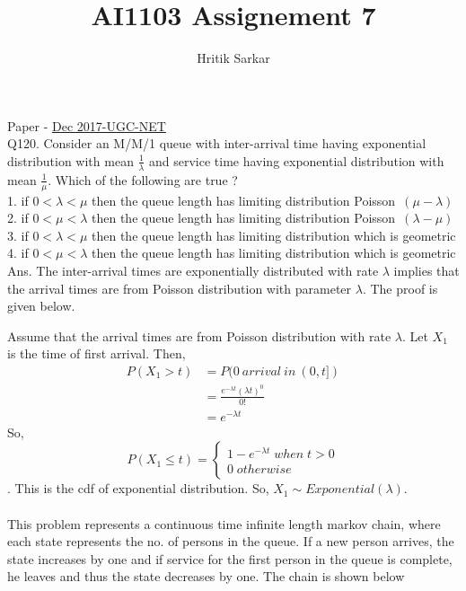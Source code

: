 \documentclass{article}
\title{AI1103 Assignement 7}
\author{Hritik Sarkar}
\theoremstyle{remark}
\begin{document}
\maketitle
Paper - \href{https://csirhrdg.res.in/SiteContent/ManagedContent/ContentFiles/20190710103539182mathA_Dec2017.pdf}{Dec 2017-UGC-NET}
\\
Q120. Consider an M/M/1 queue with inter-arrival time having exponential distribution with mean $\frac{1}{\lambda}$ and service time having exponential distribution with mean $\frac{1}{\mu}$. Which of the following are true ?
\\1. if $0<\lambda<\mu$ then the queue length has limiting distribution Poisson~$(\mu-\lambda)$
\\2. if $0<\mu<\lambda$ then the queue length has limiting distribution Poisson~$(\lambda-\mu)$
\\3. if $0<\lambda<\mu$ then the queue length has limiting distribution which is geometric
\\4. if $0<\mu<\lambda$ then the queue length has limiting distribution which is geometric
\newline
\newline
Ans.
    The inter-arrival times are exponentially distributed with rate $\lambda$ implies that the arrival times are from Poisson distribution with parameter $\lambda$. The proof is given below.
    \newline
    
    Assume that the arrival times are from Poisson distribution with rate $\lambda$. Let $X_1$ is the time of first arrival. Then,
    \begin{align*}
        P(X_1 > t) &=  P(0\: arrival\: in \:(0,t])\\
        &= \frac{e^{-\lambda t}(\lambda t)^0}{0!}\\
        &=e^{-\lambda t}
    \end{align*}
    So,
    \[
    P(X_1\le t)=
    \begin{cases}
    1-e^{-\lambda t} \; when\;t>0 \\
    0 \; otherwise
    \end{cases}
    \]. This is the cdf of exponential distribution.
    So, $X_1\sim Exponential(\lambda)$.
\newline
\\
\\
This problem represents a continuous time infinite length markov chain, where each state represents the no. of persons in the queue. If a new person arrives, the state increases by one and if service for the first person in the queue is complete, he leaves and thus the state decreases by one. The chain is shown below
\\
\end{document}
